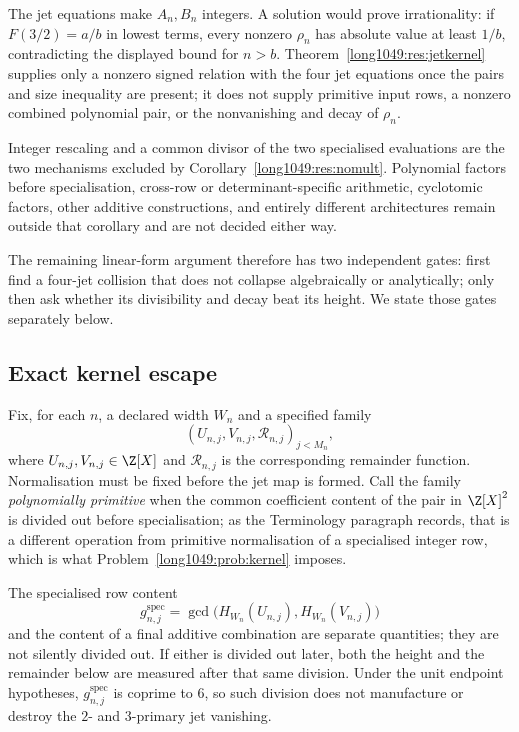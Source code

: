 The jet equations make \(A_n,B_n\) integers.  A solution would prove
irrationality: if \(F(3/2)=a/b\) in lowest terms, every nonzero \(\rho_n\) has
absolute value at least \(1/b\), contradicting the displayed bound for
\(n>b\).  Theorem~\ref{long1049:res:jetkernel} supplies only a nonzero signed relation
with the four jet equations once the pairs and size inequality are present; it
does not supply primitive input rows, a nonzero combined polynomial pair, or
the nonvanishing and decay of \(\rho_n\).

Integer rescaling and a common divisor of the two specialised evaluations are
the two mechanisms excluded by Corollary~\ref{long1049:res:nomult}.  Polynomial factors
before specialisation, cross-row or determinant-specific arithmetic,
cyclotomic factors, other additive constructions, and entirely different
architectures remain outside that corollary and are not decided either way.

The remaining linear-form argument therefore has two
independent gates: first find a four-jet collision that does not collapse
algebraically or analytically; only then ask whether its divisibility and decay
beat its height.  We state those gates separately below.

\subsection{Exact kernel escape}

Fix, for each $n$, a declared width $W_n$ and a specified family
\[
 (U_{n,j},V_{n,j},\mathcal R_{n,j})_{j<M_n},
\]
where $U_{n,j},V_{n,j}\in\Z[X]$ and $\mathcal R_{n,j}$ is the corresponding
remainder function.  Normalisation must be fixed before the jet map is formed.
Call the family \emph{polynomially primitive} when the common coefficient
content of the pair in $\Z[X]^2$ is divided out before specialisation; as the
Terminology paragraph records, that is a different operation from primitive
normalisation of a specialised integer row, which is what
Problem~\ref{long1049:prob:kernel} imposes.

The specialised row content
\[
 g^{\mathrm{spec}}_{n,j}
 =\gcd\!\bigl(H_{W_n}(U_{n,j}),H_{W_n}(V_{n,j})\bigr)
\]
and the content of a final additive combination are separate quantities; they
are not silently divided out.  If either is divided out later, both the height
and the remainder below are measured after that same division.  Under the unit
endpoint hypotheses, $g^{\mathrm{spec}}_{n,j}$ is coprime to $6$, so such
division does not manufacture or destroy the $2$- and $3$-primary jet
vanishing.

